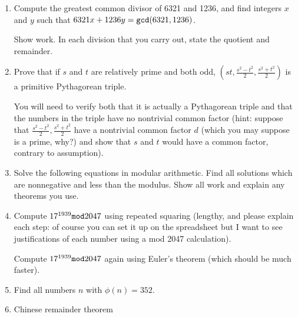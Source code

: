 \documentclass[12pt]{article}
\begin{document}
\begin{enumerate}

\item  Compute the greatest common divisor of 6321 and 1236, and find integers $x$ and $y$ such that
$6321x + 1236y = {\tt gcd}(6321,1236)$.

Show work.  In each division that you carry out, state the quotient and remainder.

\newpage

\item  Prove that if $s$ and $t$ are relatively prime and both odd, $(st,\frac{s^2-t^2}2,\frac{s^2+t^2}2)$ is a primitive Pythagorean triple.

You will need to verify both that it is actually a Pythagorean triple and that the numbers in the triple have no nontrivial common factor (hint:  suppose that $\frac{s^2-t^2}2,\frac{s^2+t^2}2$
have a nontrivial common factor $d$ (which you may suppose is a prime, why?) and show that $s$ and $t$ would have a common factor, contrary to assumption).

\newpage

\item  Solve the following equations in modular arithmetic.  Find all solutions which are nonnegative and less than the modulus.  Show all work and explain any theorems you use.


\newpage

\item  Compute $17^{1939} {\tt mod} 2047$ using repeated squaring (lengthy, and please explain each step:  of course you can set it up on the spreadsheet
but I want to see justifications of each number using a mod 2047 calculation).

Compute $17^{1939} {\tt mod} 2047$ again using Euler's theorem (which should be much faster).

\newpage

\item  Find all numbers $n$ with $\phi(n)=352$.

\newpage

\item  Chinese remainder theorem


\end{enumerate}
\end{document}
